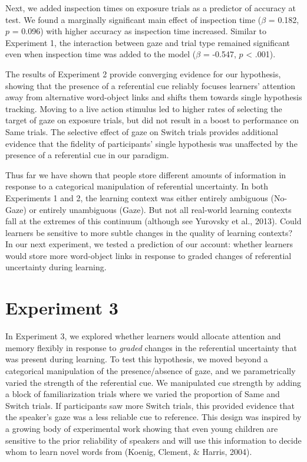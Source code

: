 \documentclass[authoryear, review]{elsarticle}
\begin{document}
Next, we added inspection times on exposure trials as a predictor of
accuracy at test. We found a marginally significant main effect of
inspection time (\(\beta\) = 0.182, \(p\) = 0.096) with higher accuracy
as inspection time increased. Similar to Experiment 1, the interaction
between gaze and trial type remained significant even when inspection
time was added to the model (\(\beta\) = -0.547, \(p\) \textless{}
.001).

The results of Experiment 2 provide converging evidence for our
hypothesis, showing that the presence of a referential cue reliably
focuses learners' attention away from alternative word-object links and
shifts them towards single hypothesis tracking. Moving to a live action
stimulus led to higher rates of selecting the target of gaze on exposure
trials, but did not result in a boost to performance on Same trials. The
selective effect of gaze on Switch trials provides additional evidence
that the fidelity of participants' single hypothesis was unaffected by
the presence of a referential cue in our paradigm.

Thus far we have shown that people store different amounts of
information in response to a categorical manipulation of referential
uncertainty. In both Experiments 1 and 2, the learning context was
either entirely ambiguous (No-Gaze) or entirely unambiguous (Gaze). But
not all real-world learning contexts fall at the extremes of this
continuum (although see Yurovsky et al., 2013). Could learners be
sensitive to more subtle changes in the quality of learning contexts? In
our next experiment, we tested a prediction of our account: whether
learners would store more word-object links in response to graded
changes of referential uncertainty during learning.

\section{Experiment 3}\label{experiment-3}

In Experiment 3, we explored whether learners would allocate attention
and memory flexibly in response to \emph{graded} changes in the
referential uncertainty that was present during learning. To test this
hypothesis, we moved beyond a categorical manipulation of the
presence/absence of gaze, and we parametrically varied the strength of
the referential cue. We manipulated cue strength by adding a block of
familiarization trials where we varied the proportion of Same and Switch
trials. If participants saw more Switch trials, this provided evidence
that the speaker's gaze was a less reliable cue to reference. This
design was inspired by a growing body of experimental work showing that
even young children are sensitive to the prior reliability of speakers
and will use this information to decide whom to learn novel words from
(Koenig, Clement, \& Harris, 2004).
\end{document}
